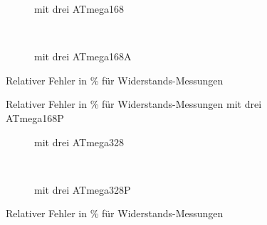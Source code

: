 \begin{figure}[H]
  \begin{subfigure}[b]{9cm}
    \centering
    \resizebox{9cm}{!}{}
    \caption{mit drei ATmega168}
    \label{fig:m168res_all}
  \end{subfigure}
  ~
  \begin{subfigure}[b]{9cm}
    \centering
    \resizebox{9cm}{!}{}
    \caption{mit drei ATmega168A}
    \label{fig:m168ares_all}
  \end{subfigure}
\caption{Relativer Fehler in \% f\"ur Widerstands-Messungen}
\end{figure}

\begin{figure}[H]
\centering

\caption{Relativer Fehler in \% f\"ur Widerstands-Messungen mit drei ATmega168P }
\label{fig:m168pres_all}
\end{figure}

\begin{figure}[H]
  \begin{subfigure}[b]{9cm}
    \centering
    \resizebox{9cm}{!}{}
    \caption{mit drei ATmega328}
    \label{fig:m328res_all}
  \end{subfigure}
  ~
  \begin{subfigure}[b]{9cm}
    \centering
    \resizebox{9cm}{!}{}
    \caption{mit drei ATmega328P}
    \label{fig:m328pres_all}
  \end{subfigure}
\caption{Relativer Fehler in \% f\"ur Widerstands-Messungen}
\end{figure}

